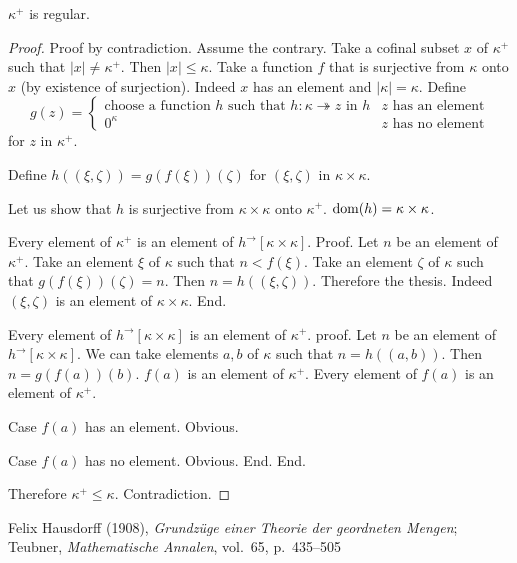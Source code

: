 \documentclass{article}
\newcommand{\Prod}[2]{#1\times #2}
\newcommand{\Succ}[1]{#1^{+}}
\newcommand{\image}[2]{#1^{\to}[#2]}
\newcommand{\card}[1]{\left|#1\right|}
\newcommand{\surjects}{\twoheadrightarrow}
\begin{document}
  \begin{forthel}
    \begin{theorem}[Hausdorff]
      $\Succ{\kappa}$ is regular.
    \end{theorem}
    \begin{proof}
      Proof by contradiction. Assume the contrary.
      Take a cofinal subset $x$ of $\Succ{\kappa}$ such that $\card{x} \neq \Succ{\kappa}$.
      Then $\card{x} \leq \kappa$.
      Take a function $f$ that is surjective from $\kappa$ onto $x$ (by existence of surjection).
      Indeed $x$ has an element and $\card{\kappa} = \kappa$.
      Define
      $$
        g(z) =
          \begin{cases}
            \text{choose a function $h$ such that $h : \kappa \surjects z$ in $h$}
            & \text{$z$ has an element}
            \\
            \text{$0^\kappa$}
            & \text{$z$ has no element}
          \end{cases}
      $$
      for $z$ in $\Succ{\kappa}$.

      Define $h((\xi,\zeta)) = g(f(\xi))(\zeta)$ for $(\xi,\zeta)$ in $\Prod{\kappa}{\kappa}$.

      Let us show that $h$ is surjective from $\Prod{\kappa}{\kappa}$ onto $\Succ{\kappa}$.
      $\dom(h) = \Prod{\kappa}{\kappa}$.

        Every element of $\Succ{\kappa}$ is an element of $\image{h}{\Prod{\kappa}{\kappa}}$.
        Proof.
          Let $n$ be an element of $\Succ{\kappa}$.
          Take an element $\xi$ of $\kappa$ such that $n < f(\xi)$.
          Take an element $\zeta$ of $\kappa$ such that $g(f(\xi))(\zeta) = n$.
          Then $n = h((\xi,\zeta))$.
          Therefore the thesis.
          Indeed $(\xi,\zeta)$ is an element of $\Prod{\kappa}{\kappa}$.
        End.

        Every element of $\image{h}{\Prod{\kappa}{\kappa}}$ is an element of $\Succ{\kappa}$.
        proof.
          Let $n$ be an element of $\image{h}{\Prod{\kappa}{\kappa}}$.
          We can take elements $a,b$ of $\kappa$ such that $n = h((a,b))$.
          Then $n = g(f(a))(b)$.
          $f(a)$ is an element of $\Succ{\kappa}$.
          Every element of $f(a)$ is an element of $\Succ{\kappa}$.

          Case $f(a)$ has an element. Obvious.

          Case $f(a)$ has no element. Obvious.
        End.
      End.

      Therefore $\Succ{\kappa} \leq \kappa$. Contradiction.
    \end{proof}
  \end{forthel}

\begin{thebibliography}{1}
   Felix Hausdorff (1908),
    \textit{Grundzüge einer Theorie der geordneten Mengen};
    Teubner, \textit{Mathematische Annalen}, vol.~65, p.~435--505
\end{thebibliography}
\end{document}
